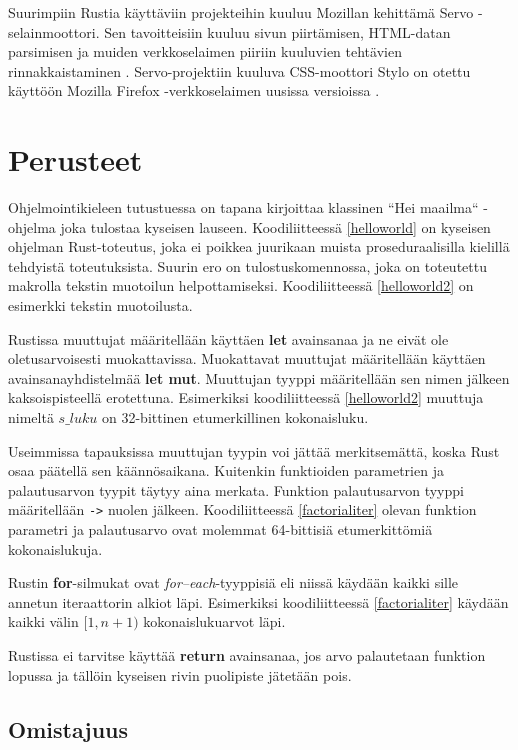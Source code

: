 \documentclass[finnish]{tktltiki2}
\theoremstyle{definition}
\theoremstyle{remark}
\begin{document}
Suurimpiin Rustia käyttäviin projekteihin kuuluu Mozillan kehittämä Servo -selainmoottori. Sen tavoitteisiin kuuluu sivun piirtämisen, HTML-datan parsimisen ja muiden verkkoselaimen piiriin kuuluvien tehtävien rinnakkaistaminen \cite{QuantumSuperFastCSSEngine}. Servo-projektiin kuuluva CSS-moottori Stylo on otettu käyttöön Mozilla Firefox -verkkoselaimen uusissa versioissa \cite{StyloIncludedInFirefox}.

\section{Perusteet}

Ohjelmointikieleen tutustuessa on tapana kirjoittaa klassinen ``Hei maailma`` -ohjelma joka tulostaa kyseisen lauseen. Koodiliitteessä \ref{helloworld} on kyseisen ohjelman Rust-toteutus, joka ei poikkea juurikaan muista proseduraalisilla kielillä tehdyistä toteutuksista. Suurin ero on tulostuskomennossa, joka on toteutettu makrolla tekstin muotoilun helpottamiseksi. Koodiliitteessä \ref{helloworld2} on esimerkki tekstin muotoilusta.

Rustissa muuttujat määritellään käyttäen \textbf{let} avainsanaa ja ne eivät ole oletusarvoisesti muokattavissa. Muokattavat muuttujat määritellään käyttäen avainsanayhdistelmää \textbf{let mut}. Muuttujan tyyppi määritellään sen nimen jälkeen kaksoispisteellä erotettuna. Esimerkiksi koodiliitteessä \ref{helloworld2} muuttuja nimeltä \texttt{$s\_luku$} on 32-bittinen etumerkillinen kokonaisluku. 

Useimmissa tapauksissa muuttujan tyypin voi jättää merkitsemättä, koska Rust osaa päätellä sen käännösaikana. Kuitenkin funktioiden parametrien ja palautusarvon tyypit täytyy aina merkata. Funktion palautusarvon tyyppi määritellään \texttt{->} nuolen jälkeen. Koodiliitteessä \ref{factorialiter} olevan funktion parametri ja palautusarvo ovat molemmat 64-bittisiä etumerkittömiä kokonaislukuja.

Rustin \textbf{for}-silmukat ovat \textit{for--each}-tyyppisiä eli niissä käydään kaikki sille annetun iteraattorin alkiot läpi. Esimerkiksi koodiliitteessä \ref{factorialiter} käydään kaikki välin $[1, n+1)$ kokonaislukuarvot läpi.

Rustissa ei tarvitse käyttää \textbf{return} avainsanaa, jos arvo palautetaan funktion lopussa ja tällöin kyseisen rivin puolipiste jätetään pois.

\subsection{Omistajuus}
\end{document}
